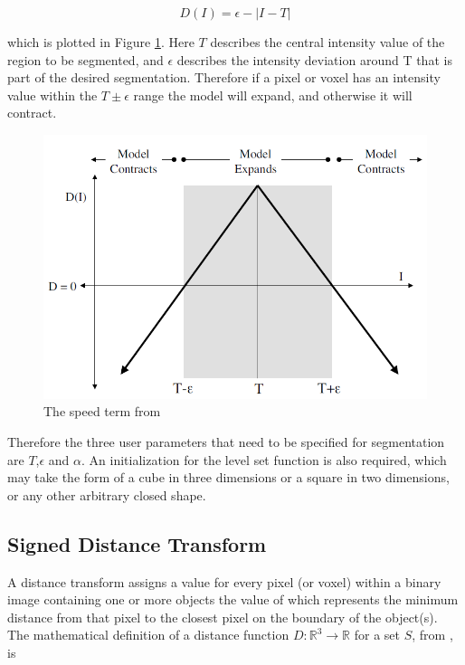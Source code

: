 	\begin{equation}
	D(I)= \epsilon - |I-T|
	\label{eq:dataterm}
	\end{equation}

which is plotted in Figure \ref{fig:speedterm}. Here $T$ describes the central intensity value of the region to be segmented, and $\epsilon$ describes the intensity deviation around T that is part of the desired segmentation. Therefore if a pixel or voxel has an intensity value within the $T\pm\epsilon$ range the model will expand, and otherwise it will contract. 

	\begin{figure}[h]
		\centering
			\includegraphics[scale=0.3]{images/speedterm.png}
		\caption{The speed term from \cite{gist}}
		\label{fig:speedterm}
	\end{figure}

Therefore the three user parameters that need to be specified for segmentation are $T$,$\epsilon$ and $\alpha$. An initialization for the level set function is also required, which may take the form of a cube in three dimensions or a square in two dimensions, or any other arbitrary closed shape. 


	\subsection{Signed Distance Transform}
A distance transform assigns a value for every pixel (or voxel) within a binary image containing one or more objects the value of which represents the minimum distance from that pixel to the closest pixel on the boundary of the object(s). The mathematical definition of a distance function $D:\mathbb{R}^3 \rightarrow \mathbb{R}$ for a set $S$, from \cite{oshersethian}, is
	
